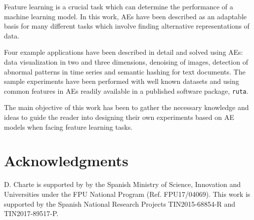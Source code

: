 Feature learning is a crucial task which can determine the performance of a machine learning model. In this work, AEs have been described as an adaptable basis for many different tasks which involve finding alternative representations of data. 

Four example applications have been described in detail and solved using AEs: data visualization in two and three dimensions, denoising of images, detection of abnormal patterns in time series and semantic hashing for text documents. The sample experiments have been performed with well known datasets and using common features in AEs readily available in a published software package, \texttt{ruta}.

The main objective of this work has been to gather the necessary knowledge and ideas to guide the reader into designing their own experiments based on AE models when facing feature learning tasks.

\section*{Acknowledgments}
D. Charte is supported by by the Spanish Ministry of Science, Innovation and Universities under the FPU National Program (Ref. FPU17/04069). This work is supported by the Spanish National Research Projects TIN2015-68854-R and TIN2017-89517-P.





